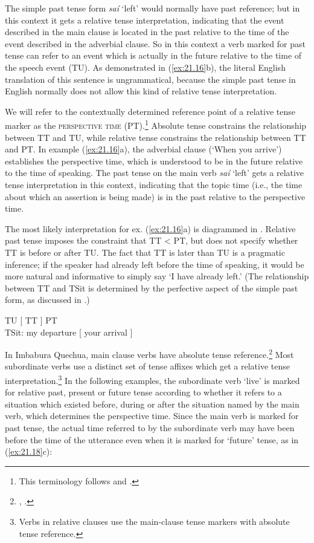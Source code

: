 The simple past tense form \textit{saí} ‘left’ would normally have past reference; but in this context it gets a relative tense interpretation, indicating that the event described in the main clause is located in the past relative to the time of the event described in the adverbial clause. So in this context a verb marked for past tense can refer to an event which is actually in the future relative to the time of the speech event (TU). As demonstrated in (\ref{ex:21.16}b), the literal English translation of this sentence is ungrammatical, because the simple past tense in English normally does not allow this kind of relative tense interpretation.



We will refer to the contextually determined reference point of a relative tense marker as the \textsc{perspective time} (PT).\footnote{This terminology follows \citet{Kiparsky2002} and \citet{Bohnemeyer2014}.} Absolute tense constrains the relationship between TT and TU, while relative tense constrains the relationship between TT and PT. In example (\ref{ex:21.16}a), the adverbial clause (‘When you arrive’) establishes the perspective time, which is understood to be in the future relative to the time of speaking. The past tense on the main verb \textit{saí} ‘left’ gets a relative tense interpretation in this context, indicating that the topic time (i.e., the time about which an assertion is being made) is in the past relative to the perspective time.



The most likely interpretation for ex. (\ref{ex:21.16}a) is diagrammed in . Relative past tense imposes the constraint that TT < PT, but does not specify whether TT is before or after TU. The fact that TT is later than TU is a pragmatic inference; if the speaker had already left before the time of speaking, it would be more natural and informative to simply say ‘I have already left.’ (The relationship between TT and TSit is determined by the perfective aspect of the simple past form, as discussed in .)


\ea \label{ex:21.17}
TU  [  TT  ]  PT  \\
      \textbf{{\textbar}}TSit: my departure\textbf{{\textbar}}    [ your arrival ]
\z


In Imbabura Quechua, main clause verbs have absolute tense reference.\footnote{\citet{Cole1982}, \citet[61]{Comrie1985}.} Most subordinate verbs use a distinct set of tense affixes which get a relative tense interpretation.\footnote{Verbs in relative clauses use the main-clause tense markers with absolute tense reference.} In the following examples, the subordinate verb ‘live’ is marked for relative past, present or future tense according to whether it refers to a situation which existed before, during or after the situation named by the main verb, which determines the perspective time. Since the main verb is marked for past tense, the actual time referred to by the subordinate verb may have been before the time of the utterance even when it is marked for ‘future’ tense, as in (\ref{ex:21.18}c):


